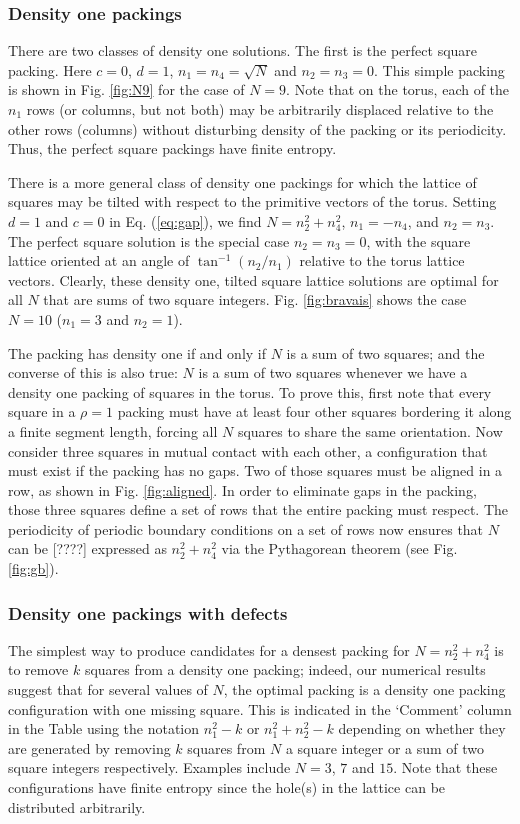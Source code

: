 \subsubsection{Density one packings}
There are two classes of density one solutions.  The first is the perfect square packing.  Here $c=0$, $d=1$, $n_1=n_4=\sqrt{N}$ and $n_2=n_3=0$.  This simple packing is shown in Fig. \ref{fig:N9} for the case of $N=9$.  Note that on the torus, each of the $n_1$ rows (or columns, but not both) may be arbitrarily displaced relative to the other rows (columns) without disturbing density of the packing or its periodicity.  Thus, the perfect square packings have finite entropy.

There is a more general class of density one packings for which the lattice of squares may be tilted with respect to the primitive vectors of the torus. Setting $d=1$ and $c=0$ in Eq. (\ref{eq:gap}), we find $N=n_2^2 + n_4^2$, $n_1=-n_4$, and $n_2 = n_3$.  The perfect square solution is the special case $n_2 = n_3 = 0$, with the square lattice oriented at an angle of $\tan^{-1}(n_2/n_1)$ relative to the torus lattice vectors.   Clearly, these density one, tilted square lattice solutions are optimal for all $N$ that are sums of two square integers.  Fig. \ref{fig:bravais} shows the case $N=10$ ($n_1=3$ and $n_2=1$).

The packing has density one if and only if $N$ is a sum of two squares; and the converse of this is also true: $N$ is a sum of two squares whenever we have a density one packing of squares in the torus. To prove this, first note that every square in a $\rho=1$ packing must have at least four other squares bordering it along a finite segment length, forcing all $N$ squares to share the same orientation.  Now consider three squares in mutual contact with each other, a configuration that must exist if the packing has no gaps. Two of those squares must be aligned in a row, as shown in Fig. \ref{fig:aligned}. In order to eliminate gaps in the packing, those three squares define a set of rows that the entire packing must respect. The periodicity of periodic boundary conditions on a set of rows now ensures that $N$ can be [????] expressed as $n_2^2 + n_4^2$ via the Pythagorean theorem (see Fig. \ref{fig:gb}).

\subsubsection{Density one packings with defects}

The simplest way to produce candidates for a densest packing for $N=n_2^2 + n_4^2$ is to remove $k$ squares from a density one packing; indeed, our numerical results suggest that for several values of $N$, the optimal packing is a density one packing configuration with one missing square.  This is indicated in the `Comment' column in the Table using the notation $n_1^2-k$ or $n_1^2+ n_2^2-k$ depending on whether they are generated by removing $k$ squares from $N$ a square integer or a sum of two square integers respectively. Examples include $N=3$, $7$ and $15$. Note that these configurations have finite entropy since the hole(s) in the lattice can be distributed arbitrarily.

